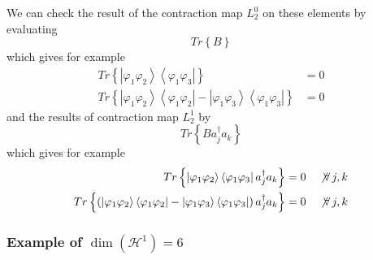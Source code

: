 \documentclass[aps,preprint]{revtex4}%
\begin{document}
We can check the result of the contraction map $L_{2}^{0}$ on these elements
by evaluating
\begin{equation}
Tr\left\{  B\right\}
\end{equation}
which gives for example
\begin{align*}
Tr\left\{  \left\vert \varphi_{1}\varphi_{2}\right\rangle \left\langle
\varphi_{1}\varphi_{3}\right\vert \right\}   &  =0\\
Tr\left\{  \left\vert \varphi_{1}\varphi_{2}\right\rangle \left\langle
\varphi_{1}\varphi_{2}\right\vert -\left\vert \varphi_{1}\varphi
_{3}\right\rangle \left\langle \varphi_{1}\varphi_{3}\right\vert \right\}   &
=0
\end{align*}
and the results of contraction map $L_{2}^{1}$ by
\begin{equation}
Tr\left\{  Ba_{j}^{\dagger}a_{k}\right\}
\end{equation}
which gives for example%
\begin{align*}
Tr\left\{  \left\vert \varphi_{1}\varphi_{2}\right\rangle \left\langle
\varphi_{1}\varphi_{3}\right\vert a_{j}^{\dagger}a_{k}\right\}   &
=0\quad\not \forall \,j,k\\
Tr\left\{  \left(  \left\vert \varphi_{1}\varphi_{2}\right\rangle \left\langle
\varphi_{1}\varphi_{2}\right\vert -\left\vert \varphi_{1}\varphi
_{3}\right\rangle \left\langle \varphi_{1}\varphi_{3}\right\vert \right)
a_{j}^{\dagger}a_{k}\right\}   &  =0\quad\not \forall \,j,k
\end{align*}


\subsubsection{Example of $\dim\left(  \mathcal{H}^{1}\right)  =6$}
\end{document}
